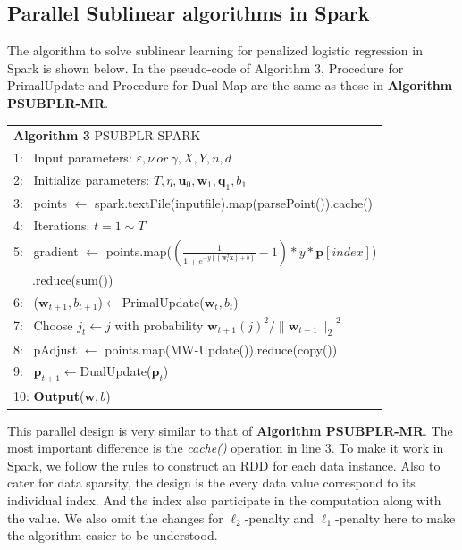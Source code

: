 \documentclass[10pt, conference, compsocconf]{IEEEtran}
\newcommand{\bw}{\mathbf{w}}
\newcommand{\bp}{\mathbf{p}}
\newcommand{\bq}{\mathbf{q}}
\newcommand{\lc}{\left(}
\newcommand{\rc}{\right)}
\newcommand{\lj}{\lc j\rc}
\newcommand{\tspace}{\hspace*{2em}}
\begin{document}
\subsection{Parallel Sublinear algorithms in Spark}
The algorithm to solve sublinear learning for penalized logistic regression in Spark is shown below.
In the pseudo-code of Algorithm 3, Procedure for PrimalUpdate and Procedure for Dual-Map are the same as those in \textbf{Algorithm  PSUBPLR-MR}.
    \begin{table}[ht]
	\begin{tabular}{l}
    \hline\noalign{\smallskip}
	\textbf{Algorithm 3} PSUBPLR-SPARK \\
	\noalign{\smallskip}
	\hline
	\noalign{\smallskip}
    1:  ~Input parameters: $\varepsilon, \nu~or~\gamma, X, Y, n, d$ \\
    2:	~Initialize parameters: $T, \eta, {\mathbf{u}}_{0}, {\bw}_{1}, {\mathbf{\bq}}_{1}, {b}_{1}$\\
    3:  ~points $\leftarrow$ spark.textFile(inputfile).map(parsePoint()).cache() \\
    4:  ~Iterations: $t=1 \sim T$ \\
    5:  ~\tspace gradient $\leftarrow$ points.map($(\frac{1}{1+e^{-y((\bw_t^T \textbf{x})+b)}}-1) * y * \bp [index]$) \\
        ~~~\tspace\tspace\tspace\tspace\tspace .reduce(sum()) \\
    6:  ~\tspace ($\bw_{t+1}, b_{t+1}$)$\leftarrow$PrimalUpdate($\bw_t, b_t$) \\
    7:  ~\tspace Choose $j_t \leftarrow j$ with probability ${{\bw}_{t+1}\lj}^{2}/{\|{\bw}_{t+1}\|_2}^{2} $ \\
    8:  ~\tspace pAdjust $\leftarrow$ points.map(MW-Update()).reduce(copy()) \\
    9:  ~\tspace $\bp_{t+1}$$\leftarrow$DualUpdate($\bp_t$)  \\
    10: \textbf{Output}($\bw, b$) \\
    \hline
    \end{tabular}
	\end{table}

This parallel design is very similar to that of \textbf{Algorithm  PSUBPLR-MR}.
The most important difference is the \textit{cache()} operation in line 3.
To make it work in Spark, we follow the rules to construct an RDD for each data instance.
Also to cater for data sparsity, the design is the every data value correspond to its individual index. And the index also participate in the computation along with the value.
We also omit the changes for $\ell_2$-penalty and $\ell_1$-penalty here to make the algorithm easier to be understood.
\end{document}
